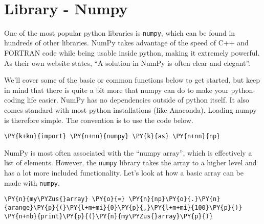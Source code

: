     \begin{center}
    \end{center}
    { \hspace*{\fill} \\}
\section{Library - Numpy}
One of the most popular python libraries is \texttt{numpy}, which can be
found in hundreds of other libraries. NumPy takes advantage of the speed
of C++ and FORTRAN code while being usable inside python, making it
extremely powerful. As their own website states, ``A solution in NumPy
is often clear and elegant''.

We'll cover some of the basic or common functions below to get started,
but keep in mind that there is quite a bit more that numpy can do to
make your python-coding life easier. NumPy has no dependencies outside
of python itself. It also comes standard with most python installations
(like Anaconda). Loading numpy is therefore simple. The convention is to
use the code below.

    \begin{tcolorbox}[breakable, size=fbox, boxrule=1pt, pad at break*=1mm,colback=cellbackground, colframe=cellborder]
\begin{Verbatim}[commandchars=\\\{\}]
\PY{k+kn}{import} \PY{n+nn}{numpy} \PY{k}{as} \PY{n+nn}{np}
\end{Verbatim}
\end{tcolorbox}

    NumPy is most often associated with the ``numpy array'', which is
effectively a list of elements. However, the \texttt{numpy} library
takes the array to a higher level and has a lot more included
functionality. Let's look at how a basic array can be made with
\texttt{numpy}.

    \begin{tcolorbox}[breakable, size=fbox, boxrule=1pt, pad at break*=1mm,colback=cellbackground, colframe=cellborder]
\begin{Verbatim}[commandchars=\\\{\}]
\PY{n}{my\PYZus{}array} \PY{o}{=} \PY{n}{np}\PY{o}{.}\PY{n}{arange}\PY{p}{(}\PY{l+m+mi}{0}\PY{p}{,}\PY{l+m+mi}{100}\PY{p}{)}
\PY{n+nb}{print}\PY{p}{(}\PY{n}{my\PYZus{}array}\PY{p}{)}
\end{Verbatim}
\end{tcolorbox}

